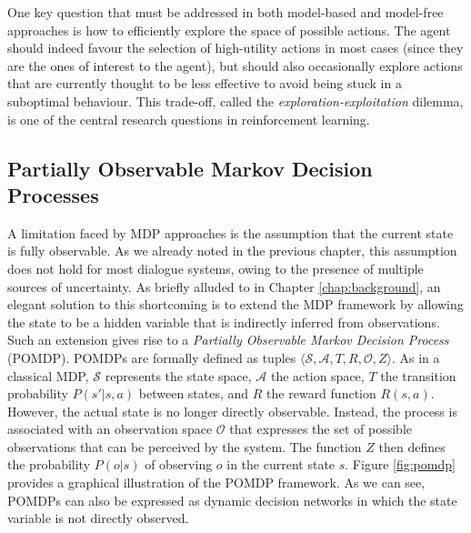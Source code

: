 One key question that must be addressed in both model-based and model-free approaches is how  to efficiently explore the space of possible actions.  The agent should indeed favour the selection of high-utility actions in most cases (since they are the ones of interest to the agent), but should also occasionally explore actions that are currently thought to be less effective to avoid being stuck in a suboptimal behaviour. This trade-off, called the \textit{exploration-exploitation} dilemma, is one of the central research questions in reinforcement learning. 


\subsection{Partially Observable Markov Decision Processes}
\label{sec:pomdp}

A limitation faced by MDP approaches is the assumption that the current state is fully observable. As we already noted in the previous chapter, this assumption does not hold for most dialogue systems, owing to the presence of multiple sources of uncertainty.  As briefly alluded to in Chapter \ref{chap:background}, an elegant solution to this shortcoming is to extend the MDP framework by allowing the state to be a hidden variable that is indirectly inferred from observations.  Such an extension gives rise to a  \textit{Partially Observable Markov Decision Process} (POMDP).  POMDPs are formally defined as tuples $\langle \mathcal{S}, \mathcal{A}, T, R, \mathcal{O}, Z \rangle$.  As in a classical MDP, $\mathcal{S}$ represents the state space, $\mathcal{A}$ the action space, $T$ the transition probability $P(s'|s,a)$ between states, and $R$ the reward function $R(s,a)$.  However, the actual state is no longer directly observable.  Instead, the process is associated with an observation space $\mathcal{O}$ that expresses the set of possible observations that can be perceived by the system. The function $Z$ then defines the probability $P(o|s)$ of observing $o$ in the current state $s$.  Figure \ref{fig:pomdp} provides a graphical illustration of the POMDP framework.  As we can see, POMDPs can also be expressed as dynamic decision networks in which the state variable is not directly observed. 

